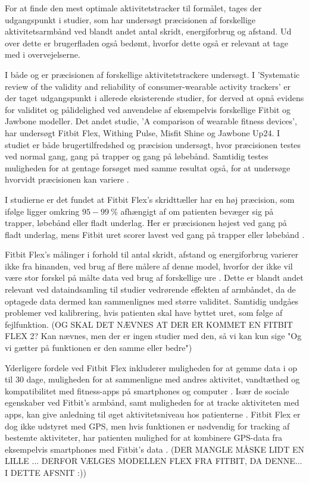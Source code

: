 For at finde den mest optimale aktivitetstracker til formålet, tages der udgangspunkt i studier, som har undersøgt præcisionen af forskellige aktivitetsarmbånd ved blandt andet antal skridt, energiforbrug og afstand. Ud over dette er brugerfladen også bedømt, hvorfor dette også er relevant at tage med i overvejelserne.

I både \citep{evenson2015} og \citep{kaewkannate2016} er præcisionen af forskellige aktivitetstrackere undersøgt. I 'Systematic review of the validity and reliability of consumer-wearable activity trackers' er der taget udgangspunkt i allerede eksisterende studier, for derved at opnå evidens for validitet og pålidelighed ved anvendelse af eksempelvis forskellige Fitbit og Jawbone modeller. Det andet studie, 'A comparison of wearable fitness devices', har undersøgt Fitbit Flex, Withing Pulse, Misfit Shine og Jawbone Up24. I studiet er både brugertilfredshed og præcision undersøgt, hvor præcisionen testes ved normal gang, gang på trapper og gang på løbebånd. Samtidig testes muligheden for at gentage forsøget med samme resultat også, for at undersøge hvorvidt præcisionen kan variere \citep{evenson2015, kaewkannate2016}.

 I studierne er det fundet at Fitbit Flex's skridttæller har en høj præcision, som ifølge \citep{kaewkannate2016} ligger omkring  $95-99~\%$ afhængigt af om patienten bevæger sig på trapper, løbebånd eller fladt underlag. Her er præcisionen højest ved gang på fladt underlag, mens Fitbit uret scorer lavest ved gang på trapper eller løbebånd \citep{kaewkannate2016}.

Fitbit Flex's målinger i forhold til antal skridt, afstand og energiforbrug varierer ikke fra hinanden, ved brug af flere målere af denne model, hvorfor der ikke vil være stor forskel på målte data ved brug af forskellige ure \citep{evenson2015}. Dette er blandt andet relevant ved dataindsamling til studier vedrørende effekten af armbåndet, da de optagede data dermed kan sammenlignes med større validitet. Samtidig undgåes problemer ved kalibrering, hvis patienten skal have byttet uret, som følge af fejlfunktion. (OG SKAL DET NÆVNES AT DER ER KOMMET EN FITBIT FLEX 2? Kan nævnes, men der er ingen studier med den, så vi kan kun sige "Og vi gætter på funktionen er den samme eller bedre")

Yderligere fordele ved Fitbit Flex inkluderer muligheden for at gemme data i op til $30$ dage, muligheden for at sammenligne med andres aktivitet, vandtæthed og kompatibilitet med fitness-apps på smartphones og computer \citep{kaewkannate2016, fitbitflex}. Især de sociale egenskaber ved Fitbit's armbånd, samt muligheden for at tracke aktiviteten med apps, kan give anledning til øget aktivitetsniveau hos patienterne \citep{karapanos2016, rooksby2014}. Fitbit Flex er dog ikke udstyret med GPS, men hvis funktionen er nødvendig for tracking af bestemte aktiviteter, har patienten mulighed for at kombinere GPS-data fra eksempelvis smartphones med Fitbit's data \citep{fitbitflex}. (DER MANGLE MÅSKE LIDT EN LILLE ... DERFOR VÆLGES MODELLEN FLEX FRA FITBIT, DA DENNE... I DETTE AFSNIT :))